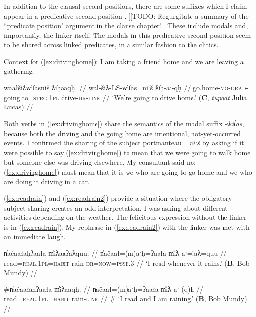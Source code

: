 In addition to the clausal second-positions, there are some suffixes which I claim appear in a predicative second position \citep{inman2018}. [[TODO: Regurgitate a summary of the ``predicate position" argument in the clause chapter!]] These include modals and, importantly, the linker itself. The modals in this predicative second position seem to be shared across linked predicates, in a similar fashion to the clitics.

\vspace{5pt}

\noindent Context for (\ref{ex:drivinghome}): I am taking a friend home and we are leaving a gathering.

\ex \label{ex:drivinghome}
\begingl
\glpreamble waałšiƛw̓it̓asniš ƛiḥaaqḥ. //
\gla wał-šiƛ-LS-w̓it̓as=niˑš ƛiḥ-aˑ-qḥ //
\glb go.home-\textsc{mo}-\textsc{grad}-going.to=\textsc{strg.1pl} drive-\textsc{dr}-\textsc{link} //
\glft `We're going to drive home.' (\textbf{C}, \textit{tupaat} Julia Lucas) //
\endgl
\xe

Both verbs in (\ref{ex:drivinghome}) share the semantics of the modal suffix \textit{-w̓it̓as}, because both the driving and the going home are intentional, not-yet-occurred events. I confirmed the sharing of the subject portmanteau \textit{=niˑš} by asking if it were possible to say (\ref{ex:drivinghome}) to mean that we were going to walk home but someone else was driving elsewhere. My consultant said no: (\ref{ex:drivinghome}) must mean that it is we who are going to go home and we who are doing it driving in a car.

(\ref{ex:readrain}) and (\ref{ex:readrain2}) provide a situation where the obligatory subject sharing creates an odd interpretation. I was asking about different activities depending on the weather. The felicitous expression without the linker is in (\ref{ex:readrain}). My rephrase in (\ref{ex:readrain2}) with the linker was met with an immediate laugh.

\ex \label{ex:readrain}
\begingl
\glpreamble n̓ačaałaḥʔaała m̓iƛaaʔaƛquu. //
\gla n̓ačaał=(m)aˑḥ=ʔaała m̓iƛ-aˑ=!aƛ=quu //
\glb read=\textsc{real.1pl}=\textsc{habit} rain-\textsc{dr}=\textsc{now}=\textsc{pssb.3} //
\glft `I read whenever it rains.' (\textbf{B}, Bob Mundy) //
\endgl
\xe

\ex \label{ex:readrain2}
\begingl
\glpreamble \#n̓ačaałaḥʔaała m̓iƛaaqḥ. //
\gla n̓ačaał=(m)aˑḥ=ʔaała m̓iƛ-aˑ-(q)ḥ //
\glb read=\textsc{real.1pl}=\textsc{habit} rain-\textsc{link} //
\glft \# `I read and I am raining.' (\textbf{B}, Bob Mundy) //
\endgl
\xe

